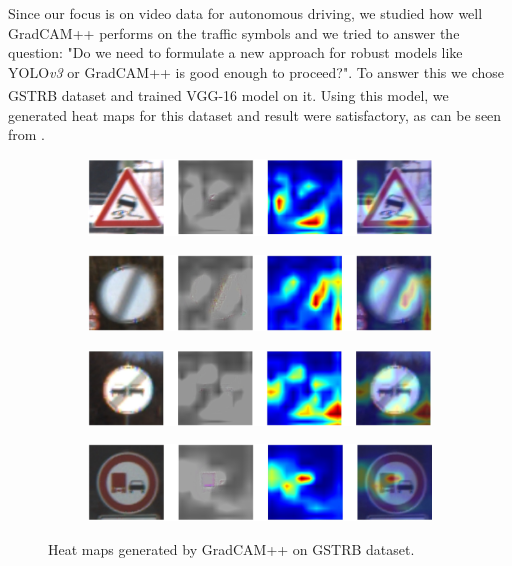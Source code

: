 \documentclass[letterpaper]{article}
\begin{document}
Since our focus is on video data for autonomous driving, we studied how well GradCAM++ performs on the traffic symbols and we tried to answer the question: "Do we need to formulate a new approach for robust models like YOLO\emph{v3} or GradCAM++ is good enough to proceed?". To answer this we chose GSTRB\textsuperscript{\cite{Houben-IJCNN-2013}} dataset and trained VGG-16 model on it. Using this model, we generated heat maps for this dataset and result were satisfactory, as can be seen from .\\
\begin{figure}[h]
    \begin{subfigure}{\textwidth}
        \includegraphics[width = \textwidth, height = 0.15\textwidth]{Images/GSTRB/16.jpg}
    \end{subfigure}
    \begin{subfigure}{\textwidth}
        \includegraphics[width = \textwidth, height = 0.15\textwidth]{Images/GSTRB/17.jpg}
    \end{subfigure}
    \begin{subfigure}{\textwidth}
        \includegraphics[width = \textwidth, height = 0.15\textwidth]{Images/GSTRB/20.jpg}
    \end{subfigure}
    \begin{subfigure}{\textwidth}
        \includegraphics[width = \textwidth, height = 0.15\textwidth]{Images/GSTRB/4.jpg}
    \end{subfigure}
    \caption{Heat maps generated by GradCAM++ on GSTRB dataset.}
    \label{fig:heat-GSTRB}
\end{figure}
\end{document}
